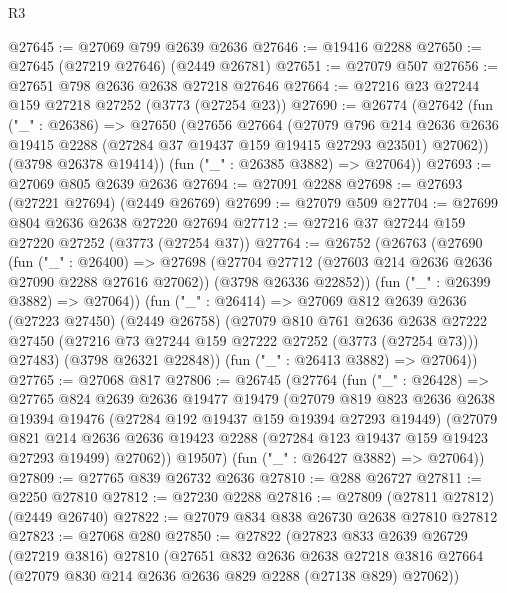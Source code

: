 \begin{lexlean}{R3}
\begin{coremodule}
@27645 := @27069 @799 @2639 @2636
@27646 := @19416 @2288
@27650 := @27645 (@27219 @27646) (@2449 @26781)
@27651 := @27079 @507
@27656 := @27651 @798 @2636 @2638 @27218 @27646
@27664 := @27216 @23 @27244 @159 @27218 @27252 (@3773 (@27254 @23))
@27690 := @26774
    (@27642
      (fun ("_" : @26386) =>
      @27650
        (@27656
          @27664
          (@27079
            @796
            @214
            @2636
            @2636
            @19415
            @2288
            (@27284 @37 @19437 @159 @19415 @27293 @23501)
            @27062))
        (@3798 @26378 @19414))
      (fun ("_" : @26385 @3882) => @27064))
@27693 := @27069 @805 @2639 @2636
@27694 := @27091 @2288
@27698 := @27693 (@27221 @27694) (@2449 @26769)
@27699 := @27079 @509
@27704 := @27699 @804 @2636 @2638 @27220 @27694
@27712 := @27216 @37 @27244 @159 @27220 @27252 (@3773 (@27254 @37))
@27764 := @26752
    (@26763
      (@27690
        (fun ("_" : @26400) =>
        @27698
          (@27704 @27712 (@27603 @214 @2636 @2636 @27090 @2288 @27616 @27062))
          (@3798 @26336 @22852))
        (fun ("_" : @26399 @3882) => @27064))
      (fun ("_" : @26414) =>
      @27069
        @812
        @2639
        @2636
        (@27223 @27450)
        (@2449 @26758)
        (@27079
          @810
          @761
          @2636
          @2638
          @27222
          @27450
          (@27216 @73 @27244 @159 @27222 @27252 (@3773 (@27254 @73)))
          @27483)
        (@3798 @26321 @22848))
      (fun ("_" : @26413 @3882) => @27064))
@27765 := @27068 @817
@27806 := @26745
    (@27764
      (fun ("_" : @26428) =>
      @27765
        @824
        @2639
        @2636
        @19477
        @19479
        (@27079
          @819
          @823
          @2636
          @2638
          @19394
          @19476
          (@27284 @192 @19437 @159 @19394 @27293 @19449)
          (@27079
            @821
            @214
            @2636
            @2636
            @19423
            @2288
            (@27284 @123 @19437 @159 @19423 @27293 @19499)
            @27062))
        @19507)
      (fun ("_" : @26427 @3882) => @27064))
@27809 := @27765 @839 @26732 @2636
@27810 := @288 @26727
@27811 := @2250 @27810
@27812 := @27230 @2288
@27816 := @27809 (@27811 @27812) (@2449 @26740)
@27822 := @27079 @834 @838 @26730 @2638 @27810 @27812
@27823 := @27068 @280
@27850 := @27822
    (@27823
      @833
      @2639
      @26729
      (@27219 @3816)
      @27810
      (@27651
        @832
        @2636
        @2638
        @27218
        @3816
        @27664
        (@27079 @830 @214 @2636 @2636 @829 @2288 (@27138 @829) @27062))

\end{coremodule}
\end{lexlean}
